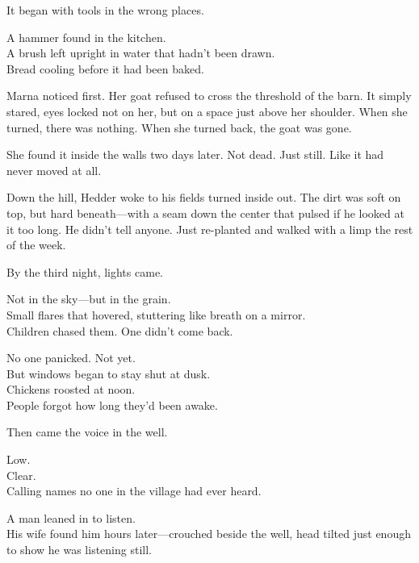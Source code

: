 \documentclass[12pt]{article}
\begin{document}
It began with tools in the wrong places.

\vspace{0.5em}
A hammer found in the kitchen.\\
A brush left upright in water that hadn’t been drawn.\\
Bread cooling before it had been baked.

\vspace{0.5em}
Marna noticed first. Her goat refused to cross the threshold of the barn. It simply stared, eyes locked not on her, but on a space just above her shoulder. When she turned, there was nothing. When she turned back, the goat was gone.

\vspace{0.5em}
She found it inside the walls two days later. Not dead. Just still. Like it had never moved at all.

\vspace{0.5em}
Down the hill, Hedder woke to his fields turned inside out. The dirt was soft on top, but hard beneath---with a seam down the center that pulsed if he looked at it too long. He didn’t tell anyone. Just re-planted and walked with a limp the rest of the week.

\vspace{0.5em}
By the third night, lights came.

\vspace{0.5em}
Not in the sky---but in the grain.\\
Small flares that hovered, stuttering like breath on a mirror.\\
Children chased them. One didn’t come back.

\vspace{0.5em}
No one panicked. Not yet.\\
But windows began to stay shut at dusk.\\
Chickens roosted at noon.\\
People forgot how long they’d been awake.

\vspace{0.5em}
Then came the voice in the well.

\vspace{0.5em}
Low.\\
Clear.\\
Calling names no one in the village had ever heard.

\vspace{0.5em}
A man leaned in to listen.\\
His wife found him hours later---crouched beside the well, head tilted just enough to show he was listening still.
\end{document}
